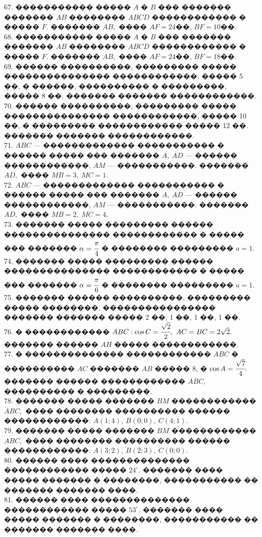 \documentclass[12pt]{article}
\begin{document}
67. ����������� ����� $A$ � $B$ ��� ������� ������� $AB$ �������� $ABCD$ ������������ � ����� $F.$ ������� $AB,$ ���� $AF=24$��, $BF=10$��.\\
68. ����������� ����� $A$ � $B$ ��� ������� ������� $AB$ �������� $ABCD$ ������������ � ����� $F.$ ������� $AB,$ ���� $AF=24$��, $BF=18$��.\\
69. ������ ����������, ��������� ����� ��������������� ������������, ����� 5 ��, � ������, ���������� � ���������, ����� 8 ��. ������� ������� ������������.\\
70. ������ ����������, ��������� ����� ��������������� ������������, ����� 10 ��, � ��������� ������������ ����� 12 ��. ������� ������� ������������.\\
71. $ABC$ --- ������������� ����������� � ������ ����� ��� ������� $A,\ AD$ --- ������ ������������, $AM$ --- �����������. ������� $AD,$ ���� $MB=3,\ MC=1.$\\
72. $ABC$ --- ������������� ����������� � ������ ����� ��� ������� $A,\ AD$ --- ������ ������������, $AM$ --- �����������. ������� $AD,$ ���� $MB=2,\ MC=4.$\\
73. ������� ����� ��������� ������ ��������������� ������������ � ����� ��� ������� $\alpha=\cfrac{\pi}{4}$ � �������� ��������� $a=1.$\\
74. ������� ����� ��������� ������ ��������������� ������������ � ����� ��� ������� $\alpha=\cfrac{\pi}{6}$ � �������� ��������� $a=1.$\\
75. ������� ������ ����������, ��������� ����� ��������, ���������������� ������� ������� ����� 2 ��, 1 ��, 1 ��, 1 ��.\\
76. � ������������ $ABC: \cos C=\cfrac{\sqrt{2}}{2},\ AC=BC=2\sqrt{2}.$ ������� ������ $AH$ ����� ������������.\\
77. � �������������� ������������ $ABC$ � ���������� $AC$ ������� $AB$ ����� 8, � $\cos A=\cfrac{\sqrt{7}}{4}.$ ������� ������ ������������ $ABC,$ ���������� � ���������.\\
78. ������� ����� ������� $BM$ ������������ $ABC,$ ���� �������� ���������� ������ ������������: $A(1;4),\ B(0;0),\ C(4;1).$\\
79. ������� ����� ������� $BM$ ������������ $ABC,$ ���� �������� ���������� ������ ������������: $A(3;2),\ B(2;3),\ C(0;0).$\\
80. ������ ���� �������������� ������������ ����� $24^\circ.$ ������� ���� ����� ������� � ��������, ����������� �� ������� ������� ����.\\
81. ������ ���� �������������� ������������ ����� $53^\circ.$ ������� ���� ����� ������� � ��������, ����������� �� ������� ������� ����.\\
\end{document}
